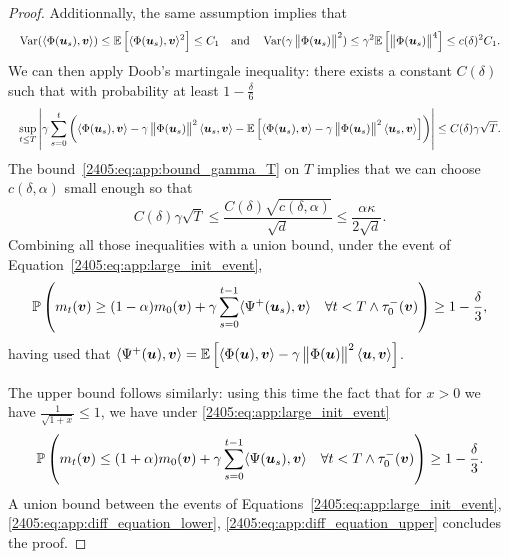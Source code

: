 \begin{proof}
  Additionnally, the same assumption implies that
  \[
    \resizebox{\linewidth}{!}{$\displaystyle
      \operatorname{Var}(\langle \Phi(\vec{u}_s), \vec{v} \rangle)  \leq \Ea{\langle \Phi(\vec{u}_s), \vec{v} \rangle^2} \leq C_1 \quad \text{and} \quad \operatorname{Var}(\gamma\norm{\Phi(\vec{u}_s)}^2) \leq \gamma^2\Ea{\norm{\Phi(\vec{u}_s)}^4} \leq c(\delta)^2 C_1.
    $}
  \]
  We can then apply Doob's martingale inequality: there exists a constant $C(\delta)$ such that with probability at least $1 - \frac\delta6$
  \[
    \resizebox{\linewidth}{!}{$\displaystyle
      \sup_{t \leq T} \left| \gamma\sum_{s = 0}^t  \left( \langle \Phi(\vec{u}_s), \vec{v} \rangle - \gamma\norm{\Phi(\vec{u}_s)}^2\langle \vec{u}_s, \vec{v} \rangle - \Ea{\langle \Phi(\vec{u}_s), \vec{v} \rangle - \gamma\norm{\Phi(\vec{u}_s)}^2\langle \vec{u}_s, \vec{v} \rangle} \right) \right| \leq C(\delta)\gamma\sqrt{T}.
    $}
  \]
  The bound~\eqref{2405:eq:app:bound_gamma_T} on $T$ implies that we can choose $c(\delta, \alpha)$ small enough so that
  \[ C(\delta)\gamma\sqrt{T} \leq \frac{C(\delta) \sqrt{c(\delta, \alpha)}}{\sqrt{d}} \leq \frac{\alpha\kappa}{2\sqrt{d}}.\]
  Combining all those inequalities with a union bound, under the event of Equation~\eqref{2405:eq:app:large_init_event},
  \begin{equation}\label{2405:eq:app:diff_equation_lower}
    \mathbb{P}\left( m_t({\boldsymbol{v}}) \geq (1 - \alpha) m_0({\boldsymbol{v}}) + \gamma\sum_{s=0}^{t-1} \langle \Psi^+({\boldsymbol{u}}_s), {\boldsymbol{v}} \rangle \quad \forall t < T \wedge \tau_0^-({\boldsymbol{v}})\right) \geq 1 - \frac\delta3,
  \end{equation}
  having used that $\langle \Psi^+({\boldsymbol{u}}), {\boldsymbol{v}} \rangle = \mathbb{E}\left[\langle \Phi({\boldsymbol{u}}), {\boldsymbol{v}} \rangle - \gamma\left\lVert \Phi({\boldsymbol{u}})\right\rVert^2\langle {\boldsymbol{u}}, {\boldsymbol{v}} \rangle\right]$.

  The upper bound follows similarly:  using this time the fact that for $x > 0$ we have $\frac1{\sqrt{1+x}} \leq 1$, we have under \eqref{2405:eq:app:large_init_event}
  \begin{equation}\label{2405:eq:app:diff_equation_upper}
    \mathbb{P}\left( m_t({\boldsymbol{v}}) \leq (1 + \alpha) m_0({\boldsymbol{v}}) + \gamma\sum_{s=0}^{t-1} \langle \Psi({\boldsymbol{u}}_s), {\boldsymbol{v}} \rangle \quad \forall t < T \wedge \tau_0^-({\boldsymbol{v}})\right) \geq 1 - \frac\delta3.
  \end{equation}
  A union bound between the events of Equations~\eqref{2405:eq:app:large_init_event}, \eqref{2405:eq:app:diff_equation_lower}, \eqref{2405:eq:app:diff_equation_upper} concludes the proof.
\end{proof}

